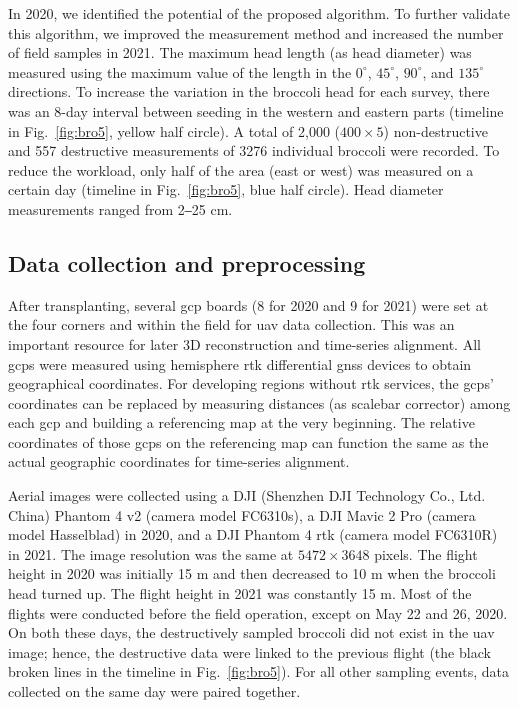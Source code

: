 In 2020, we identified the potential of the proposed algorithm. To further validate this algorithm, we improved the measurement method and increased the number of field samples in 2021. The maximum head length (as head diameter) was measured using the maximum value of the length in the $0^\circ$, $45^\circ$, $90^\circ$, and $135^\circ$ directions. To increase the variation in the broccoli head for each survey, there was an 8-day interval between seeding in the western and eastern parts (timeline in Fig.~\ref{fig:bro5}, yellow half circle). A total of 2,000 ($400 \times 5$) non-destructive and 557 destructive measurements of 3276 individual broccoli were recorded. To reduce the workload, only half of the area (east or west) was measured on a certain day (timeline in Fig.~\ref{fig:bro5}, blue half circle). Head diameter measurements ranged from 2‒25 cm.

\subsection{Data collection and preprocessing} \label{sec:cp3data}

After transplanting, several \gls{gcp} boards (8 for 2020 and 9 for 2021) were set at the four corners and within the field for \gls{uav} data collection. This was an important resource for later 3D reconstruction and time-series alignment. All \gls{gcp}s were measured using hemisphere \gls{rtk} differential \gls{gnss} devices to obtain geographical coordinates. For developing regions without \gls{rtk} services, the \gls{gcp}s' coordinates can be replaced by measuring distances (as scalebar corrector) among each \gls{gcp} and building a referencing map at the very beginning. The relative coordinates of those \gls{gcp}s on the referencing map can function the same as the actual geographic coordinates for time-series alignment.

Aerial images were collected using a DJI (Shenzhen DJI Technology Co., Ltd. China) Phantom 4 v2 (camera model FC6310s), a DJI Mavic 2 Pro (camera model Hasselblad) in 2020, and a DJI Phantom 4 \gls{rtk} (camera model FC6310R) in 2021. The image resolution was the same at $5472 \times 3648$ pixels. The flight height in 2020 was initially 15 m and then decreased to 10 m when the broccoli head turned up. The flight height in 2021 was constantly 15 m. Most of the flights were conducted before the field operation, except on May 22 and 26, 2020. On both these days, the destructively sampled broccoli did not exist in the \gls{uav} image; hence, the destructive data were linked to the previous flight (the black broken lines in the timeline in Fig.~\ref{fig:bro5}). For all other sampling events, data collected on the same day were paired together.

